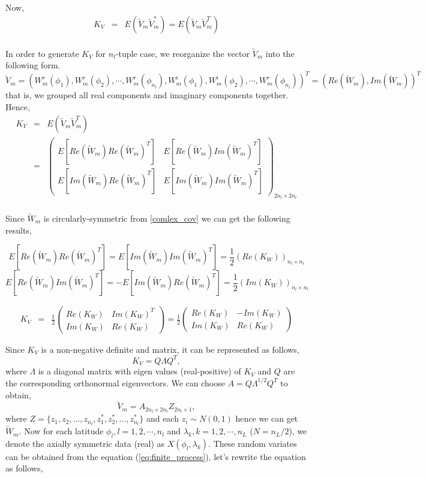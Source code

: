 	Now,
	\begin{eqnarray*}
		K_V & = & E(\utilde{V}_m\utilde{V}_m^*) = E(\utilde{V}_m\utilde{V}_m^T) \\
	\end{eqnarray*}
	
	In order to generate $K_V$ for $n_l$-tuple case, we reorganize the vector $\utilde{V}_m$ into the following form.
	\[
		\utilde{V}_m = (W_m^r(\phi_1), W_m^r(\phi_2),\cdots,W_m^r(\phi_{n_l}), W_m^i(\phi_1), W_m^i(\phi_2), \cdots, W_m^r(\phi_{n_l}))^T = (Re(\utilde{W}_m), Im(\utilde{W}_m))^T
	\]
	that is, we grouped all real components and imaginary components together. Hence,
	\begin{eqnarray*}
		K_V &=& E(\utilde{V}_m\utilde{V}_m^T) \\
		&=& \left(\begin{array}{ll}
		E[Re(\utilde{W}_m)Re(\utilde{W}_m)^T] &  E[Re(\utilde{W}_m)Im(\utilde{W}_m)^T] \\
		E[Im(\utilde{W}_m)Re(\utilde{W}_m)^T] &  E[Im(\utilde{W}_m)Im(\utilde{W}_m)^T]
		\end{array}
		\right)_{2n_{l}\times 2n_{l} } \\
	\end{eqnarray*}
	
	Since $\utilde{W}_m$ is circularly-symmetric from \ref{comlex_cov} we can get the following results,
	
	\[ E[Re(\utilde{W}_m)Re(\utilde{W}_m)^T] = E[Im(\utilde{W}_m)Im(\utilde{W}_m)^T] = \frac{1}{2}(Re(K_W))_{n_{l}\times n_{l}} \]
	\[ E[Re(\utilde{W}_m)Im(\utilde{W}_m)^T] = -E[Im(\utilde{W}_m)Re(\utilde{W}_m)^T] = \frac{1}{2}(Im(K_W))_{n_{l}\times n_{l}}\]
	
	\begin{eqnarray*}
		K_V&=& \frac{1}{2}\left( \begin{array}{ll}
		Re(K_W) & Im(K_W)^T \\
		Im(K_W) & Re(K_W)
		\end{array}
		\right) = \frac{1}{2}\left( \begin{array}{ll}
		Re(K_W) & -Im(K_W) \\
		Im(K_W) & Re(K_W)
		\end{array}
		\right)
	\end{eqnarray*}
	
	Since $K_V$ is a non-negative definite and matrix, it can be represented as follows,
	\[ K_V = Q\Lambda Q^T, \]
	where $\Lambda$ is a diagonal matrix with eigen values (real-positive) of $K_V$ and $Q$ are the corresponding orthonormal eigenvectors. We can choose $A = Q\Lambda^{1/2} Q^T$ to obtain,
	\[\utilde{V}_m=A_{2n_{l}\times 2n_{l}}Z_{2n_{l}\times 1},\]
	where $Z =\{z_1, z_2, \ldots, z_{n_l}, z_1^*, z_2^*, \ldots, z_{n_l}^*\}$ and each $z_i\sim N(0,1)$ hence we can get $\utilde{W}_m$.
	Now  for each latitude $\phi_l, l = 1, 2, \cdots, n_l$ and $\lambda_k, k = 1, 2, \cdots, n_L$ ($N = n_L/2$), we denote the axially symmetric data (real) as $X(\phi_l, \lambda_k)$. These random variates can be obtained from the equation (\ref{eq:finite_process}), let's rewrite the equation as follows,
	
